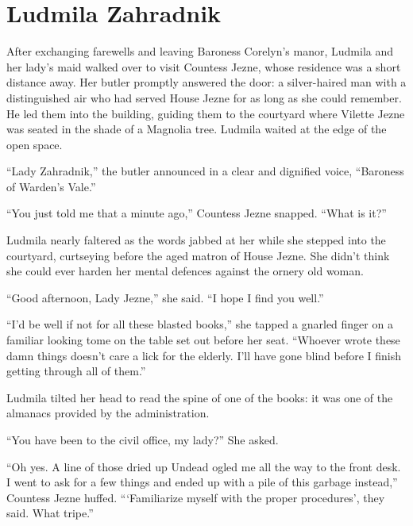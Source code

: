 \chapter{Ludmila Zahradnik}

After exchanging farewells and leaving Baroness Corelyn’s manor, Ludmila and her lady’s maid walked over to visit Countess Jezne, whose residence was a short distance away. Her butler promptly answered the door: a silver-haired man with a distinguished air who had served House Jezne for as long as she could remember. He led them into the building, guiding them to the courtyard where Vilette Jezne was seated in the shade of a Magnolia tree. Ludmila waited at the edge of the open space.

 

“Lady Zahradnik,” the butler announced in a clear and dignified voice, “Baroness of Warden’s Vale.”

 

“You just told me that a minute ago,” Countess Jezne snapped. “What is it?”

 

Ludmila nearly faltered as the words jabbed at her while she stepped into the courtyard, curtseying before the aged matron of House Jezne. She didn’t think she could ever harden her mental defences against the ornery old woman.

 

“Good afternoon, Lady Jezne,” she said. “I hope I find you well.”

 

“I’d be well if not for all these blasted books,” she tapped a gnarled finger on a familiar looking tome on the table set out before her seat. “Whoever wrote these damn things doesn’t care a lick for the elderly. I’ll have gone blind before I finish getting through all of them.”

 

Ludmila tilted her head to read the spine of one of the books: it was one of the almanacs provided by the administration.

 

“You have been to the civil office, my lady?” She asked.

 

“Oh yes. A line of those dried up Undead ogled me all the way to the front desk. I went to ask for a few things and ended up with a pile of this garbage instead,” Countess Jezne huffed. “‘Familiarize myself with the proper procedures’, they said. What tripe.”


